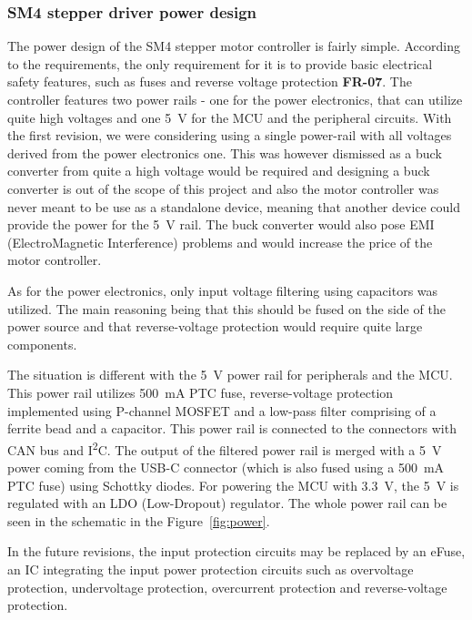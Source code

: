 
\subsubsection{SM4 stepper driver power design}
\label{subsubsec:power_design}
The power design of the SM4 stepper motor controller is fairly simple.
According to the requirements, the only requirement for it is to provide basic electrical safety features, such as fuses and reverse voltage protection \textbf{FR-07}.
The controller features two power rails - one for the power electronics, that can utilize quite high voltages and one 5~V for the MCU and the peripheral circuits.
With the first revision, we were considering using a single power-rail with all voltages derived from the power electronics one.
This was however dismissed as a buck converter from quite a high voltage would be required and designing a buck converter is out of the scope of this project and also the motor controller was never meant to be use as a standalone device, meaning that another device could provide the power for the 5~V rail.
The buck converter would also pose EMI (ElectroMagnetic Interference) problems and would increase the price of the motor controller.

As for the power electronics, only input voltage filtering using capacitors was utilized.
The main reasoning being that this should be fused on the side of the power source and that reverse-voltage protection would require quite large components.

The situation is different with the 5~V power rail for peripherals and the MCU.
This power rail utilizes 500~mA PTC fuse, reverse-voltage protection implemented using P-channel MOSFET and a low-pass filter comprising of a ferrite bead and a capacitor.
This power rail is connected to the connectors with CAN bus and I\textsuperscript{2}C.
The output of the filtered power rail is merged with a 5~V power coming from the USB-C connector (which is also fused using a 500~mA PTC fuse) using Schottky diodes.
For powering the MCU with 3.3~V, the 5~V is regulated with an LDO (Low-Dropout) regulator.
The whole power rail can be seen in the schematic in the Figure~\ref{fig:power}.

In the future revisions, the input protection circuits may be replaced by an eFuse\cite{efuse_great_scott}\cite{efuse}, an IC integrating the input power protection circuits such as overvoltage protection, undervoltage protection, overcurrent protection and reverse-voltage protection.


